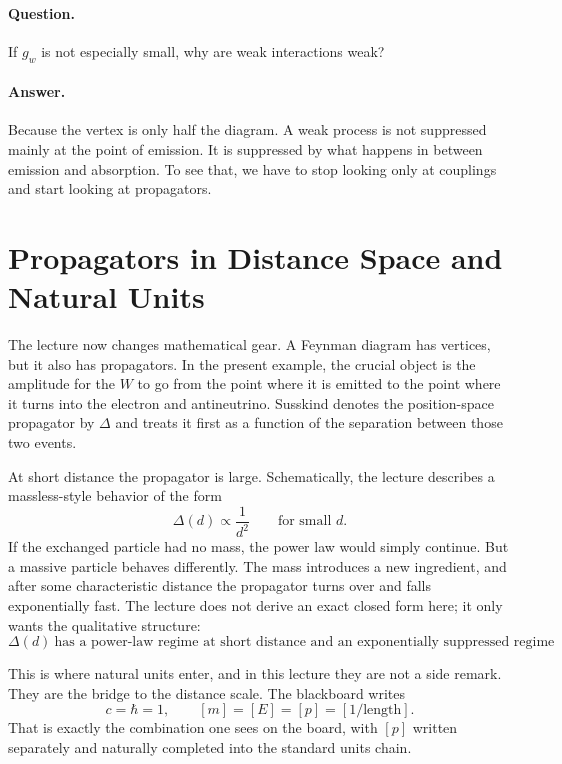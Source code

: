 \paragraph{Question.} If \(g_w\) is not especially small, why are weak interactions weak?

\paragraph{Answer.} Because the vertex is only half the diagram. A weak process is not suppressed mainly at the point of emission. It is suppressed by what happens in between emission and absorption. To see that, we have to stop looking only at couplings and start looking at propagators.

\section{Propagators in Distance Space and Natural Units}

The lecture now changes mathematical gear. A Feynman diagram has vertices, but it also has propagators. In the present example, the crucial object is the amplitude for the \(W\) to go from the point where it is emitted to the point where it turns into the electron and antineutrino. Susskind denotes the position-space propagator by \(\Delta\) and treats it first as a function of the separation between those two events.

At short distance the propagator is large. Schematically, the lecture describes a massless-style behavior of the form
\begin{equation}
\Delta(d)\propto \frac{1}{d^2}
\qquad
\text{for small } d.
\end{equation}
If the exchanged particle had no mass, the power law would simply continue. But a massive particle behaves differently. The mass introduces a new ingredient, and after some characteristic distance the propagator turns over and falls exponentially fast. The lecture does not derive an exact closed form here; it only wants the qualitative structure:
\begin{equation}
\Delta(d)\ \text{has a power-law regime at short distance and an exponentially suppressed regime at large distance.}
\end{equation}

This is where natural units enter, and in this lecture they are not a side remark. They are the bridge to the distance scale. The blackboard writes
\begin{equation}
c=\hbar=1,
\qquad
[m]=[E]=[p]=[1/\text{length}].
\end{equation}
That is exactly the combination one sees on the board, with \([p]\) written separately and naturally completed into the standard units chain.

